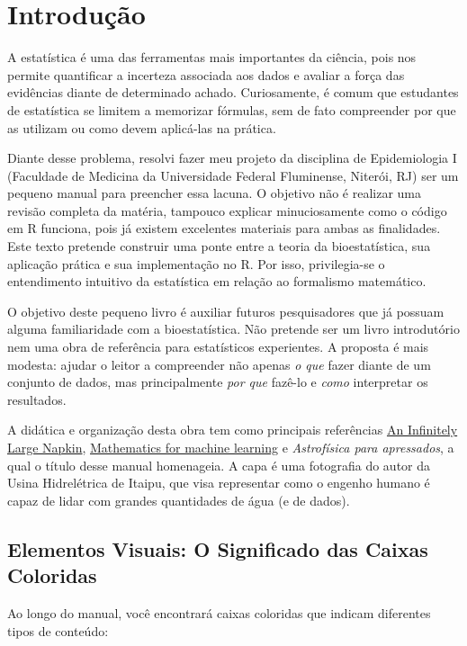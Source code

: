 \chapter*{Introdução}

A estatística é uma das ferramentas mais importantes da ciência, pois nos permite quantificar a incerteza associada aos dados e avaliar a força das evidências diante de determinado achado. Curiosamente, é comum que estudantes de estatística se limitem a memorizar fórmulas, sem de fato compreender por que as utilizam ou como devem aplicá-las na prática.

Diante desse problema, resolvi fazer meu projeto da disciplina de Epidemiologia I (Faculdade de Medicina da Universidade Federal Fluminense, Niterói, RJ) ser um pequeno manual para preencher essa lacuna. O objetivo não é realizar uma revisão completa da matéria, tampouco explicar minuciosamente como o código em R funciona, pois já existem excelentes materiais para ambas as finalidades. Este texto pretende construir uma ponte entre a teoria da bioestatística, sua aplicação prática e sua implementação no R. Por isso, privilegia-se o entendimento intuitivo da estatística em relação ao formalismo matemático.

O objetivo deste pequeno livro é auxiliar futuros pesquisadores que já possuam alguma familiaridade com a bioestatística. Não pretende ser um livro introdutório nem uma obra de referência para estatísticos experientes. A proposta é mais modesta: ajudar o leitor a compreender não apenas \textit{o que} fazer diante de um conjunto de dados, mas principalmente \textit{por que} fazê-lo e \textit{como} interpretar os resultados.

A didática e organização desta obra tem como principais referências \href{https://venhance.github.io/napkin/Napkin.pdf}{An Infinitely Large Napkin}, \href{https://mml-book.github.io/book/mml-book.pdf}{Mathematics for machine learning} e \textit{Astrofísica para apressados}, a qual o título desse manual homenageia. A capa é uma fotografia do autor da Usina Hidrelétrica de Itaipu, que visa representar como o engenho humano é capaz de lidar com grandes quantidades de água (e de dados).

\section*{Elementos Visuais: O Significado das Caixas Coloridas}

Ao longo do manual, você encontrará caixas coloridas que indicam diferentes tipos de conteúdo:

